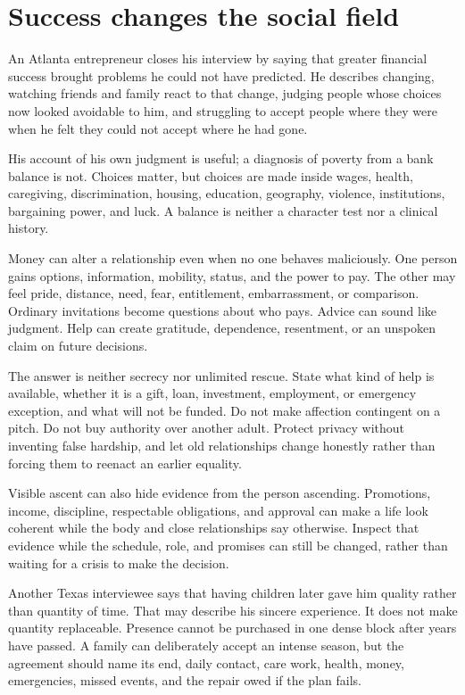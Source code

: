 \section{Success changes the social field}

An Atlanta entrepreneur closes his interview by saying that greater financial
success brought problems he could not have predicted. He describes changing,
watching friends and family react to that change, judging people whose choices
now looked avoidable to him, and struggling to accept people where they were
when he felt they could not accept where he had gone.

His account of his own judgment is useful; a diagnosis of poverty from a bank
balance is not. Choices matter, but choices are made inside wages, health,
caregiving, discrimination, housing, education, geography, violence,
institutions, bargaining power, and luck. A balance is neither a character test
nor a clinical history.

Money can alter a relationship even when no one behaves maliciously. One
person gains options, information, mobility, status, and the power to pay. The
other may feel pride, distance, need, fear, entitlement, embarrassment, or
comparison. Ordinary invitations become questions about who pays. Advice can
sound like judgment. Help can create gratitude, dependence, resentment, or an
unspoken claim on future decisions.

The answer is neither secrecy nor unlimited rescue. State what kind of help is
available, whether it is a gift, loan, investment, employment, or emergency
exception, and what will not be funded. Do not make affection contingent on a
pitch. Do not buy authority over another adult. Protect privacy without
inventing false hardship, and let old relationships change honestly rather
than forcing them to reenact an earlier equality.

Visible ascent can also hide evidence from the person ascending. Promotions,
income, discipline, respectable obligations, and approval can make a life look
coherent while the body and close relationships say otherwise. Inspect that
evidence while the schedule, role, and promises can still be changed, rather
than waiting for a crisis to make the decision.

Another Texas interviewee says that having children later gave him quality
rather than quantity of time. That may describe his sincere experience. It
does not make quantity replaceable. Presence cannot be purchased in one dense
block after years have passed. A family can deliberately accept an intense
season, but the agreement should name its end, daily contact, care work,
health, money, emergencies, missed events, and the repair owed if the plan
fails.

